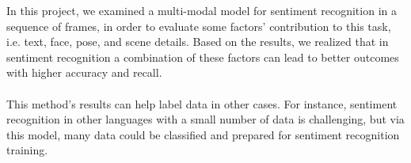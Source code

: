 In this project, we examined a multi-modal model for sentiment recognition in a sequence of frames, in order to evaluate some factors' contribution to this task, i.e. text, face, pose, and scene details. Based on the results, we realized that in sentiment recognition a combination of these factors can lead to better outcomes with higher accuracy and recall.

\paragraph{} This method's results can help label data in other cases. For instance, sentiment recognition in other languages with a small number of data is challenging, but via this model, many data could be classified and prepared for sentiment recognition training.


